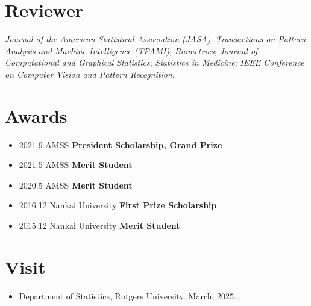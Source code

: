 \documentclass[letterpaper,12pt]{article}
\newcommand{\resumeSubHeadingListStart}{\begin{itemize}[leftmargin=*]}
\newcommand{\resumeSubHeadingListEnd}{\end{itemize}}
\newcommand{\shorterSection}[1]{\vspace{-10pt}\section{#1}}
\begin{document}
  \shorterSection{Reviewer}
   \emph{Journal of the American Statistical Association (JASA)}; \emph{Transactions on Pattern Analysis and Machine Intelligence (TPAMI)}; \emph{Biometrics}; \emph{Journal of Computational and Graphical Statistics}; \emph{ Statistics in Medicine};  \emph{IEEE Conference on Computer Vision and Pattern Recognition}.
 \vspace{10pt}
  \shorterSection{Awards}
    \resumeSubHeadingListStart
   \item{2021.9 \hspace{5cm} AMSS \hfill \bf{President Scholarship, Grand Prize}}
   \item{2021.5 \hspace{5cm} AMSS \hfill \bf{Merit Student}}
    \item{2020.5 \hspace{5cm} AMSS \hfill \bf{Merit Student}}
   \item{2016.12 \hspace{4.75cm} Nankai University \hfill \bf{First Prize Scholarship}}
   \item{2015.12 \hspace{4.75cm} Nankai University \hfill \bf{Merit Student}}
     \resumeSubHeadingListEnd
     
     
      \shorterSection{Visit}
     \resumeSubHeadingListStart
     \item{Department of Statistics, Rutgers University. March, 2025.}
     \resumeSubHeadingListEnd
     
\end{document}
